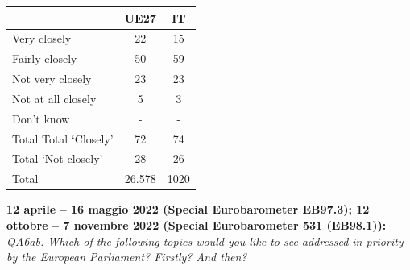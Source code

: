 \documentclass[
]{book}
\begin{document}
\begin{longtable}[]{@{}lcc@{}}
\toprule\noalign{}
& UE27 & IT \\
\midrule\noalign{}
\endhead
\bottomrule\noalign{}
\endlastfoot
Very closely & 22 & 15 \\
Fairly closely & 50 & 59 \\
Not very closely & 23 & 23 \\
Not at all closely & 5 & 3 \\
Don't know & - & - \\
Total Total `Closely' & 72 & 74 \\
Total `Not closely' & 28 & 26 \\
Total & 26.578 & 1020 \\
\end{longtable}

\textbf{12 aprile -- 16 maggio 2022 (Special Eurobarometer EB97.3); 12 ottobre -- 7 novembre 2022 (Special Eurobarometer 531 (EB98.1)):} \emph{QA6ab. Which of the following topics would you like to see addressed in priority by the European Parliament? Firstly? And then?}
\end{document}

